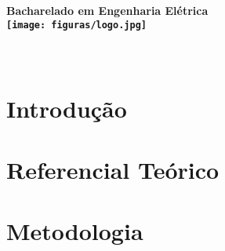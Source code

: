 \documentclass[
	12pt,				%
	openright,			%
	oneside,
	a4paper,
	english,			%
	french,				%
	spanish,			%
	brazil,				%
	]{abntex2}
\begin{document}
\begin{titlingpage}
    \centering
    \vfill
    {\bfseries\Large
        Bacharelado em Engenharia Elétrica\\
        \texttt{[image: figuras/logo.jpg]}
        \vskip2cm
        \imprimirautor\\
        \vspace{2.5cm}
        \huge 
       \imprimirtitulo\\[1cm]
    }
    \vfill
    \vfill
    \vfill
    \Large
    \imprimirlocal\\
    \imprimirdata
\end{titlingpage}


\frenchspacing 

\imprimirfolhaderosto

\tableofcontents*
\cleardoublepage

\textual

\chapter[Introdução]{Introdução}\label{cap:introducao}



\chapter[Referencial Teórico]{Referencial Teórico}\label{cap:referencial}


\chapter[Metodologia]{Metodologia}\label{cap:metodologia}





\postextual



\end{document}
